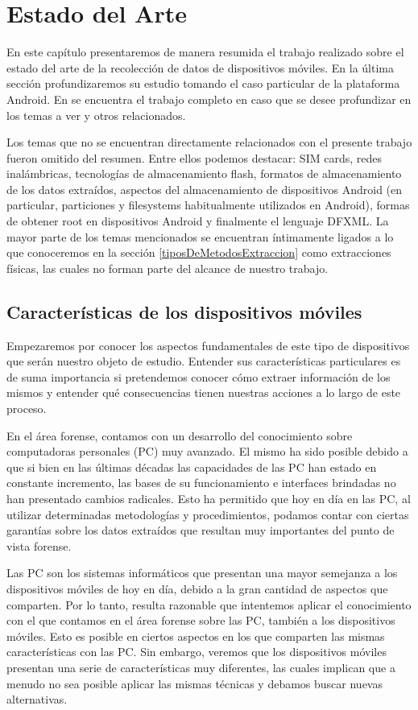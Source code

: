 \chapter{Estado del Arte}
En este capítulo presentaremos de manera resumida el trabajo realizado sobre el estado del arte de la recolección de datos de dispositivos móviles. En la última sección profundizaremos su estudio tomando el caso particular de la plataforma Android. En \cite{estadoDelArte} se encuentra el trabajo completo en caso que se desee profundizar en los temas a ver y otros relacionados.

Los temas que no se encuentran directamente relacionados con el presente trabajo fueron omitido del resumen. Entre ellos podemos destacar: SIM cards, redes inalámbricas, tecnologías de almacenamiento flash, formatos de almacenamiento de los datos extraídos, aspectos del almacenamiento de dispositivos Android (en particular, particiones y filesystems habitualmente utilizados en Android), formas de obtener root en dispositivos Android y finalmente el lenguaje DFXML. La mayor parte de los temas mencionados se encuentran íntimamente ligados a lo que conoceremos en la sección \ref{tiposDeMetodosExtraccion} como extracciones físicas, las cuales no forman parte del alcance de nuestro trabajo.

\section{Características de los dispositivos móviles}
Empezaremos por conocer los aspectos fundamentales de este tipo de dispositivos que serán nuestro objeto de estudio. Entender sus características particulares es de suma importancia si pretendemos conocer cómo extraer información de los mismos y entender qué consecuencias tienen nuestras acciones a lo largo de este proceso.

En el área forense, contamos con un desarrollo del conocimiento sobre computadoras personales (PC) muy avanzado. El mismo ha sido posible debido a que si bien en las últimas décadas las capacidades de las PC han estado en constante incremento, las bases de su funcionamiento e interfaces brindadas no han presentado cambios radicales. Esto ha permitido que hoy en día en las PC, al utilizar determinadas metodologías y procedimientos, podamos contar con ciertas garantías sobre los datos extraídos que resultan muy importantes del punto de vista forense.

Las PC son los sistemas informáticos que presentan una mayor semejanza a los dispositivos móviles de hoy en día, debido a la gran cantidad de aspectos que comparten. Por lo tanto, resulta razonable que intentemos aplicar el conocimiento con el que contamos en el área forense sobre las PC, también a los dispositivos móviles. Esto es posible en ciertos aspectos en los que comparten las mismas características con las PC. Sin embargo, veremos que los dispositivos móviles presentan una serie de características muy diferentes, las cuales implican que a menudo no sea posible aplicar las mismas técnicas y debamos buscar nuevas alternativas.

